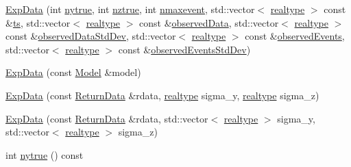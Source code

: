 \begin{DoxyCompactItemize}
\item 
\mbox{\hyperlink{classamici_1_1_exp_data_af7b389e6ef9cd1cd5facacc783a8e1e9}{Exp\+Data}} (int \mbox{\hyperlink{classamici_1_1_exp_data_ac2657ffc58ee1ea80d6c4db40010e942}{nytrue}}, int \mbox{\hyperlink{classamici_1_1_exp_data_a9e9b6341842d8860b0114faa4e0c97ee}{nztrue}}, int \mbox{\hyperlink{classamici_1_1_exp_data_ae6996d31ed94180a4b1d79412eb5ce31}{nmaxevent}}, std\+::vector$<$ \mbox{\hyperlink{namespaceamici_a1bdce28051d6a53868f7ccbf5f2c14a3}{realtype}} $>$ const \&\mbox{\hyperlink{classamici_1_1_exp_data_aa7014a80e7b102f85a10e3b9a480e8e5}{ts}}, std\+::vector$<$ \mbox{\hyperlink{namespaceamici_a1bdce28051d6a53868f7ccbf5f2c14a3}{realtype}} $>$ const \&\mbox{\hyperlink{classamici_1_1_exp_data_a6acedf749a3c5e4c4dcbc822f58a565d}{observed\+Data}}, std\+::vector$<$ \mbox{\hyperlink{namespaceamici_a1bdce28051d6a53868f7ccbf5f2c14a3}{realtype}} $>$ const \&\mbox{\hyperlink{classamici_1_1_exp_data_aa097568cebb4be48c4c1dfaab0c2a159}{observed\+Data\+Std\+Dev}}, std\+::vector$<$ \mbox{\hyperlink{namespaceamici_a1bdce28051d6a53868f7ccbf5f2c14a3}{realtype}} $>$ const \&\mbox{\hyperlink{classamici_1_1_exp_data_a629e6085839e16bac95ef0eba580f7f0}{observed\+Events}}, std\+::vector$<$ \mbox{\hyperlink{namespaceamici_a1bdce28051d6a53868f7ccbf5f2c14a3}{realtype}} $>$ const \&\mbox{\hyperlink{classamici_1_1_exp_data_abb12a8f75b4e6c936ae6c0be770628c9}{observed\+Events\+Std\+Dev}})
\item 
\mbox{\hyperlink{classamici_1_1_exp_data_af4ce16765488e3857131aa5aea0c38b4}{Exp\+Data}} (const \mbox{\hyperlink{classamici_1_1_model}{Model}} \&model)
\item 
\mbox{\hyperlink{classamici_1_1_exp_data_a30619c6fa4a5f5cc07e7dcc0824aa0fc}{Exp\+Data}} (const \mbox{\hyperlink{classamici_1_1_return_data}{Return\+Data}} \&rdata, \mbox{\hyperlink{namespaceamici_a1bdce28051d6a53868f7ccbf5f2c14a3}{realtype}} sigma\+\_\+y, \mbox{\hyperlink{namespaceamici_a1bdce28051d6a53868f7ccbf5f2c14a3}{realtype}} sigma\+\_\+z)
\item 
\mbox{\hyperlink{classamici_1_1_exp_data_ac1cf98522f4ac1b25f33b6b3fdd69d95}{Exp\+Data}} (const \mbox{\hyperlink{classamici_1_1_return_data}{Return\+Data}} \&rdata, std\+::vector$<$ \mbox{\hyperlink{namespaceamici_a1bdce28051d6a53868f7ccbf5f2c14a3}{realtype}} $>$ sigma\+\_\+y, std\+::vector$<$ \mbox{\hyperlink{namespaceamici_a1bdce28051d6a53868f7ccbf5f2c14a3}{realtype}} $>$ sigma\+\_\+z)
\item 
int \mbox{\hyperlink{classamici_1_1_exp_data_ac2657ffc58ee1ea80d6c4db40010e942}{nytrue}} () const

\end{DoxyCompactItemize}
